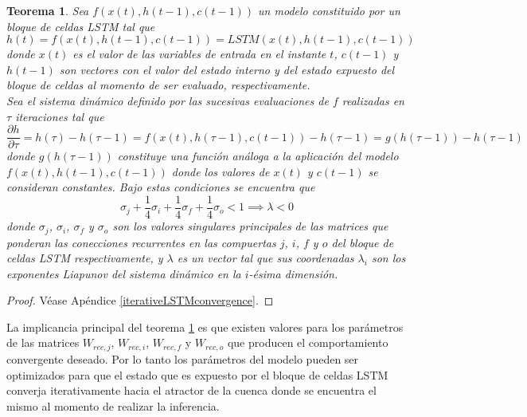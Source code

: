 \documentclass{article}
\newtheorem{theorem}{Teorema}
\begin{document}
	\begin{theorem}
		\label{iterativeLSTMConvergenceTheorem}
		Sea $f(x(t), h(t-1), c(t-1))$ un modelo constituido por un bloque de celdas LSTM tal que
		\begin{equation*}
		h(t) = f(x(t), h(t-1), c(t-1)) =  LSTM(x(t), h(t-1), c(t-1))
		\end{equation*}
		donde $x(t)$ es el valor de las variables de entrada en el instante $t$, $c(t-1)$ y $h(t-1)$ son vectores con el valor del estado interno y del estado expuesto del bloque de celdas al momento de ser evaluado, respectivamente.\\
		Sea el sistema dinámico definido por las sucesivas evaluaciones de $f$ realizadas en $\tau$ iteraciones tal que
		\begin{equation*}
		\dfrac{\partial h}{\partial \tau} = h(\tau) -  h(\tau-1) = f(x(t), h(\tau-1), c(t-1)) - h(\tau-1) = g(h(\tau-1)) - h(\tau-1)
		\end{equation*}
		donde $g(h(\tau-1))$ constituye una función análoga a la aplicación del modelo $f(x(t), h(t-1), c(t-1))$ donde los valores de $x(t)$ y $c(t-1)$ se consideran constantes.
		Bajo estas condiciones se encuentra que
		\begin{equation*}
		\sigma_j + \frac{1}{4} \sigma_i + \frac{1}{4} \sigma_f + \frac{1}{4} \sigma_o < 1 \implies \lambda < 0
		\end{equation*}
		donde $\sigma_j$, $\sigma_i$, $\sigma_f$ y $\sigma_o$ son los valores singulares principales de las matrices que ponderan las conecciones recurrentes en las compuertas $j$, $i$, $f$ y $o$ del bloque de celdas LSTM respectivamente, y $\lambda$ es un vector tal que sus coordenadas $\lambda_i$ son los exponentes Liapunov del sistema dinámico en la $i$-ésima dimensión.
	\end{theorem}
	\begin{proof}
		Véase Apéndice \ref{iterativeLSTMconvergence}.
	\end{proof}
	
	La implicancia principal del teorema \ref{iterativeLSTMConvergenceTheorem} es que existen valores para los parámetros de las matrices $W_{rec,j}$, $W_{rec,i}$, $W_{rec,f}$ y $W_{rec,o}$ que producen el comportamiento convergente deseado. Por lo tanto los parámetros del modelo pueden ser optimizados para que el estado que es expuesto por el bloque de celdas LSTM converja iterativamente hacia el atractor de la cuenca donde se encuentra el mismo al momento de realizar la inferencia.\\
	
\end{document}
